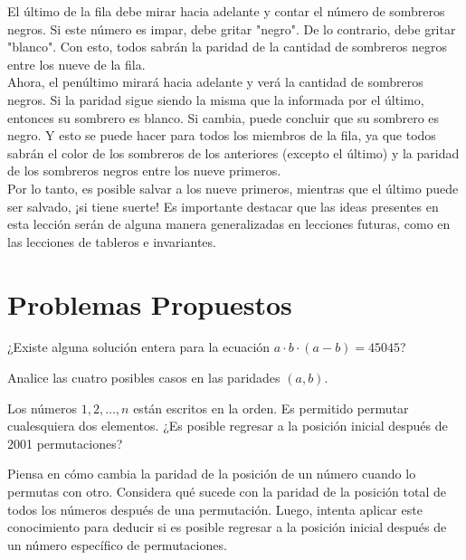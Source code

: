 \documentclass[11pt]{scrartcl}
\begin{document}
El último de la fila debe mirar hacia adelante y contar el número de sombreros negros. Si este número es impar, debe gritar "negro". De lo contrario, debe gritar "blanco". Con esto, todos sabrán la paridad de la cantidad de sombreros negros entre los nueve de la fila.\\

Ahora, el penúltimo mirará hacia adelante y verá la cantidad de sombreros negros. Si la paridad sigue siendo la misma que la informada por el último, entonces su sombrero es blanco. Si cambia, puede concluir que su sombrero es negro. Y esto se puede hacer para todos los miembros de la fila, ya que todos sabrán el color de los sombreros de los anteriores (excepto el último) y la paridad de los sombreros negros entre los nueve primeros.\\

Por lo tanto, es posible salvar a los nueve primeros, mientras que el último puede ser salvado, ¡si tiene suerte! Es importante destacar que las ideas presentes en esta lección serán de alguna manera generalizadas en lecciones futuras, como en las lecciones de tableros e invariantes.


\section{Problemas Propuestos}
\begin{problem}
    ¿Existe alguna solución entera para la ecuación \(a\cdot b\cdot (a-b)=45045\)?
    \begin{hint}
    Analice las cuatro posibles casos en las paridades \((a,b)\).
    \end{hint}
\end{problem}

\begin{problem}
    Los números \(1,2,\ldots, n\) están escritos en la orden. Es permitido permutar cualesquiera dos elementos. ¿Es posible regresar a la posición inicial después de 2001 permutaciones?
    \begin{hint}
        Piensa en cómo cambia la paridad de la posición de un número cuando lo permutas con otro. Considera qué sucede con la paridad de la posición total de todos los números después de una permutación. Luego, intenta aplicar este conocimiento para deducir si es posible regresar a la posición inicial después de un número específico de permutaciones.
    \end{hint}
\end{problem}
\end{document}
